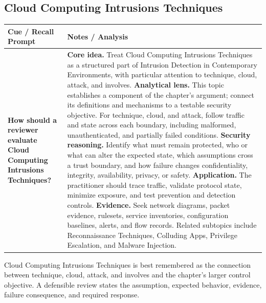 \documentclass[11pt]{article}
\newcommand{\CornellHeader}{%
\rowcolor{Navy}\color{white}\bfseries Cue / Recall Prompt & \color{white}\bfseries Notes / Analysis\\\hline}
\newcommand{\CornellRow}[2]{%
\cellcolor{CueGray}\RaggedRight\textbf{#1} & \RaggedRight #2\\\hline}
\begin{document}
\subsection*{Cloud Computing Intrusions Techniques}
\begin{longtable}{>{\RaggedRight\arraybackslash}p{}|>{\RaggedRight\arraybackslash}p{}}
\CornellHeader
\CornellRow{How should a reviewer evaluate Cloud Computing Intrusions Techniques?}{\textbf{Core idea.} Treat Cloud Computing Intrusions Techniques as a structured part of Intrusion Detection in Contemporary Environments, with particular attention to technique, cloud, attack, and involves. \textbf{Analytical lens.} This topic establishes a component of the chapter's argument; connect its definitions and mechanisms to a testable security objective. For technique, cloud, and attack, follow traffic and state across each boundary, including malformed, unauthenticated, and partially failed conditions. \textbf{Security reasoning.} Identify what must remain protected, who or what can alter the expected state, which assumptions cross a trust boundary, and how failure changes confidentiality, integrity, availability, privacy, or safety. \textbf{Application.} The practitioner should trace traffic, validate protocol state, minimize exposure, and test prevention and detection controls. \textbf{Evidence.} Seek network diagrams, packet evidence, rulesets, service inventories, configuration baselines, alerts, and flow records. Related subtopics include Reconnaissance Techniques, Colluding Apps, Privilege Escalation, and Malware Injection.}
\end{longtable}
\begin{topicsummary}
Cloud Computing Intrusions Techniques is best remembered as the connection between technique, cloud, attack, and involves and the chapter's larger control objective. A defensible review states the assumption, expected behavior, evidence, failure consequence, and required response.
\end{topicsummary}
\end{document}
